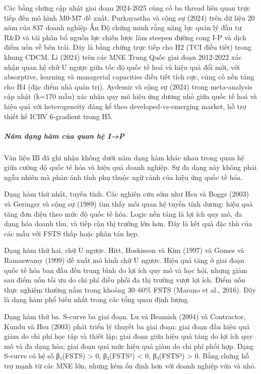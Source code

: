 \documentclass[12pt,a4paper]{article}
\begin{document}
Các bằng chứng cập nhật giai đoạn 2024-2025 củng cố ba thread liên quan
trực tiếp đến mô hình M0-M7 đề xuất. Purkayastha và cộng sự (2024) trên
dữ liệu 20 năm của 837 doanh nghiệp Ấn Độ chứng minh rằng năng lực quản
lý đầu tư R\&D và tái phân bổ nguồn lực chiến lược làm steepen đường
cong I-P và dịch điểm uốn về bên trái. Đây là bằng chứng trực tiếp cho
H2 (TCI điều tiết) trong khung CDCM. Li (2024) trên các MNE Trung Quốc
giai đoạn 2012-2022 xác nhận quan hệ chữ U ngược giữa tốc độ quốc tế hoá
và hiệu quả đổi mới, với absorptive, learning và managerial capacities
điều tiết tích cực, củng cố nền tảng cho H4 (đặc điểm nhà quản trị).
Aydemir và cộng sự (2024) trong meta-analysis cập nhật (k=170 mẫu) xác
nhận quy mô hiệu ứng dương nhỏ giữa quốc tế hoá và hiệu quả với
heterogeneity đáng kể theo developed-vs-emerging market, hỗ trợ thiết kế
ICRV 6-gradient trong H5.

\hypertarget{nux103m-dux1ea1ng-huxe0m-cux1ee7a-quan-hux1ec7-ip}{%
\subparagraph{Năm dạng hàm của quan hệ
I→P}\label{nux103m-dux1ea1ng-huxe0m-cux1ee7a-quan-hux1ec7-ip}}

Văn liệu IB đã ghi nhận không dưới năm dạng hàm khác nhau trong quan hệ
giữa cường độ quốc tế hóa và hiệu quả doanh nghiệp. Sự đa dạng này không
phải ngẫu nhiên mà phản ánh tính phụ thuộc ngữ cảnh của hiệu ứng quốc tế
hóa.

Dạng hàm thứ nhất, tuyến tính. Các nghiên cứu sớm như Hsu và Boggs
(2003) và Geringer và cộng sự (1989) tìm thấy mối quan hệ tuyến tính
dương: hiệu quả tăng đơn điệu theo mức độ quốc tế hóa. Logic nền tảng là
lợi ích quy mô, đa dạng hóa doanh thu, và tiếp cận thị trường lớn hơn.
Đây là kết quả đặc thù của các mẫu với FSTS thấp hoặc phân tán hẹp.

Dạng hàm thứ hai, chữ U ngược. Hitt, Hoskisson và Kim (1997) và Gomes và
Ramaswamy (1999) đề xuất mô hình chữ U ngược. Hiệu quả tăng ở giai đoạn
quốc tế hóa ban đầu đến trung bình do lợi ích quy mô và học hỏi, nhưng
giảm sau điểm uốn tối ưu do chi phí điều phối đa thị trường vượt lợi
ích. Điểm uốn thực nghiệm thường nằm trong khoảng 30--60\% FSTS (Marano
et al., 2016). Đây là dạng hàm phổ biến nhất trong các tổng quan định
lượng.

Dạng hàm thứ ba. S-curve ba giai đoạn. Lu và Beamish (2004) và
Contractor, Kundu và Hsu (2003) phát triển lý thuyết ba giai đoạn: giai
đoạn đầu hiệu quả giảm do chi phí học tập và thiết lập; giai đoạn giữa
hiệu quả tăng do lợi ích quy mô và đa dạng hóa; giai đoạn quá mức hiệu
quả giảm do chi phí phối hợp. Dạng S-curve có hệ số β₁(FSTS)
\textgreater{} 0, β₂(FSTS²) \textless{} 0, β₃(FSTS³) \textgreater{} 0.
Bằng chứng hỗ trợ mạnh từ các MNE lớn, nhưng kém ổn định hơn với doanh
nghiệp vừa và nhỏ.
\end{document}
